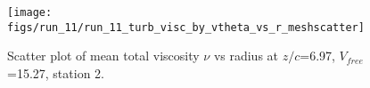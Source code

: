 \begin{figure}[H]
\centering
\texttt{[image: figs/run\_11/run\_11\_turb\_visc\_by\_vtheta\_vs\_r\_meshscatter]}
\caption{Scatter plot of mean total viscosity $\nu$ vs radius at $z/c$=6.97, $V_{free}$=15.27, station 2.}
\label{fig:run_11_turb_visc_by_vtheta_vs_r_meshscatter}
\end{figure}


